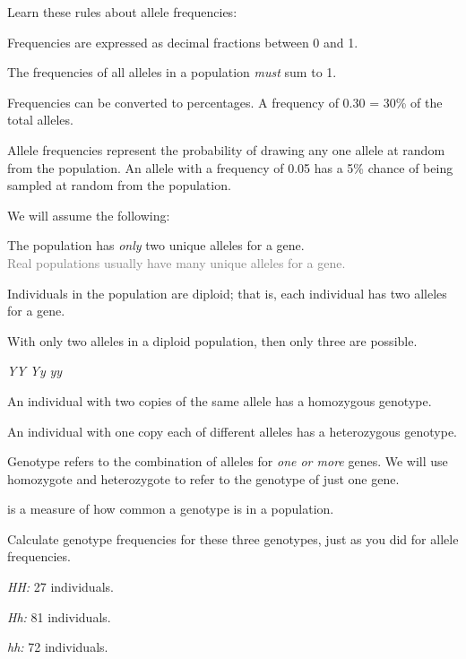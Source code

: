 \documentclass[t]{beamer}
\begin{document}
%
%
\begin{frame}[t]{Learn these rules about allele frequencies:}

	\hangpara Frequencies are expressed as decimal fractions between 0 and 1.
	
	\hangpara The frequencies of all alleles in a population \emph{must} sum to 1.
	
	\hangpara Frequencies can be converted to percentages. A frequency of 0.30 = 30\% of the total alleles.
	
	\hangpara Allele frequencies represent the probability of drawing any one allele at random from the population. An allele with a frequency of 0.05 has a 5\% chance of being sampled at random from the population.

\end{frame}
%
\begin{frame}[t]{We will assume the following:}

	\hangpara The population has \emph{only} two unique alleles for a gene.\\ \quad \textcolor{gray}{Real populations usually have many unique alleles for a gene.}
	 

	\hangpara Individuals in the population are diploid; that is, each individual has two alleles for a gene.
	
\end{frame}
%
\begin{frame}[t]{With only two alleles in a diploid population, then only three  are possible.}

\Large
\hfil \alert<2>{\emph{YY}} \hfil \alert<3>{\emph{Yy}} \hfil \alert<2>{\emph{yy}} \hfill

\normalsize
	\hangpara {}An individual with two copies of the same allele has a \alert<2>{homozygous} genotype.
	
	\hangpara {}An individual with one copy each of different alleles has a \alert<3>{heterozygous} genotype.
	
	\hangpara {}\textsc{} Genotype refers to the combination of alleles for \emph{one or more} genes. We will use homozygote and heterozygote to refer to the genotype of just one gene.

\end{frame}
%
\begin{frame}[t]{ is a measure of how common a genotype is in a population.}

	\hangpara Calculate genotype frequencies for these three genotypes, just as you did for allele frequencies.
	
	\hangpara \quad \emph{HH:} 27 individuals. \onslide<2>{0.15}
	
	\hangpara \quad	\emph{Hh:} 81 individuals. \onslide<2>{0.45}
	
	\hangpara \quad \emph{hh:} 72 individuals. \onslide<2>{0.40}

\end{frame}
\end{document}
